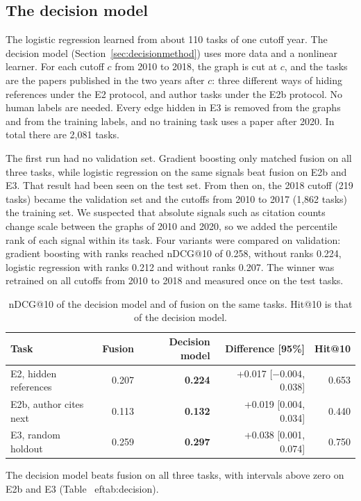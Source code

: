 \documentclass[11pt,a4paper]{article}
\begin{document}
\subsection{The decision model}\label{sec:decision}
The logistic regression learned from about 110 tasks of one cutoff year. The decision model (Section~\ref{sec:decisionmethod}) uses more data and a nonlinear learner. For each cutoff $c$ from 2010 to 2018, the graph is cut at $c$, and the tasks are the papers published in the two years after $c$: three different ways of hiding references under the E2 protocol, and author tasks under the E2b protocol. No human labels are needed. Every edge hidden in E3 is removed from the graphs and from the training labels, and no training task uses a paper after 2020. In total there are 2,081 tasks.

The first run had no validation set. Gradient boosting only matched fusion on all three tasks, while logistic regression on the same signals beat fusion on E2b and E3. That result had been seen on the test set. From then on, the 2018 cutoff (219 tasks) became the validation set and the cutoffs from 2010 to 2017 (1,862 tasks) the training set. We suspected that absolute signals such as citation counts change scale between the graphs of 2010 and 2020, so we added the percentile rank of each signal within its task. Four variants were compared on validation: gradient boosting with ranks reached nDCG@10 of 0.258, without ranks 0.224, logistic regression with ranks 0.212 and without ranks 0.207. The winner was retrained on all cutoffs from 2010 to 2018 and measured once on the test tasks.
\begin{table}[htbp]\centering\small
\begin{tabular}{@{}lrrrr@{}}\toprule
Task & Fusion & Decision model & Difference [95\%] & Hit@10\\\midrule
E2, hidden references & 0.207 & \textbf{0.224} & +0.017 [$-0.004$, 0.038] & 0.653\\
E2b, author cites next & 0.113 & \textbf{0.132} & +0.019 [0.004, 0.034] & 0.440\\
E3, random holdout & 0.259 & \textbf{0.297} & +0.038 [0.001, 0.074] & 0.750\\\bottomrule
\end{tabular}\caption{nDCG@10 of the decision model and of fusion on the same tasks. Hit@10 is that of the decision model.}\label{tab:decision}\end{table}
The decision model beats fusion on all three tasks, with intervals above zero on E2b and E3 (Table~
ef{tab:decision}).
\end{document}
